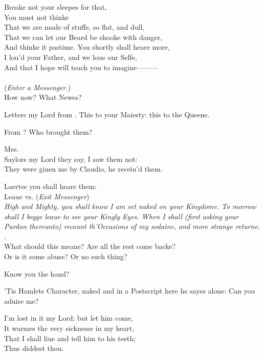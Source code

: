 \documentclass[a5paper,DIV=calc,11pt]{scrbook}
\begin{document}
\begin{drama*}
    \kingspeaks Breake not your sleepes for that,\\
    You must not thinke\\
    That we are made of stuffe, so flat, and dull,\\
    That we can let our Beard be shooke with danger,\\
    And thinke it pastime. You shortly shall heare more,\\
    I lou'd your Father, and we loue our Selfe,\\
    And that I hope will teach you to imagine———\\
    \mbox{}\\
    (\textit{Enter a Messenger.})\\
    How now? What Newes?
    
     Letters my Lord from \ham. This to your Maiesty: this to the Queene.
    
    \kingspeaks From \ham? Who brought them?
    
    Mes.\\
    Saylors my Lord they say, I saw them not:\\
    They were giuen me by Claudio, he receiu'd them.
    
    \kingspeaks Laertes you shall heare them:\\
    Leaue vs. \hfill(\textit{Exit Messenger})\\
    \hspace{2em}\textit{High and Mighty, you shall know I am set naked on your Kingdome. To morrow shall I begge leaue to see your Kingly Eyes. When I shall (first asking your Pardon thereunto) recount th'Occasions of my sodaine, and more strange returne.}\\
    \hfill \ham.\\
    What should this meane? Are all the rest come backe?\\
    Or is it some abuse? Or no such thing?
    
    \laerspeaks Know you the hand?
    
    \kingspeaks 'Tis Hamlets Character, naked and in a Postscript here he sayes alone: Can you aduise me?
    
    \laerspeaks I'm lost in it my Lord; but let him come,\\
    It warmes the very sicknesse in my heart,\\
    That I shall liue and tell him to his teeth;\\
    Thus diddest thou.
    

\end{drama*}
\end{document}
